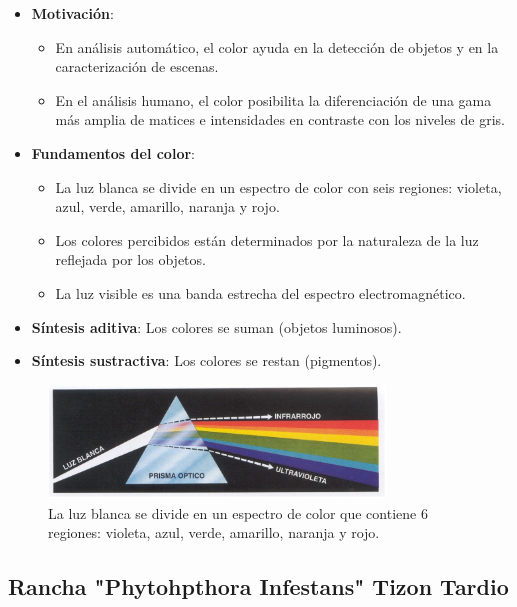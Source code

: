 \begin{itemize}
	\item \textbf{Motivación}:
	\begin{itemize}
		\item En análisis automático, el color ayuda en la detección de objetos y en la caracterización de escenas.
		\item En el análisis humano, el color posibilita la diferenciación de una gama más amplia de matices e intensidades en contraste con los niveles de gris.
	\end{itemize}
	\item \textbf{Fundamentos del color}: 
	\begin{itemize}
		\item La luz blanca se divide en un espectro de color con seis regiones: violeta, azul, verde, amarillo, naranja y rojo.
		\item Los colores percibidos están determinados por la naturaleza de la luz reflejada por los objetos.
		\item La luz visible es una banda estrecha del espectro electromagnético.
	\end{itemize}
	\item \textbf{Síntesis aditiva}: Los colores se suman (objetos luminosos).
	\item \textbf{Síntesis sustractiva}: Los colores se restan (pigmentos).
\end{itemize}
	\begin{figure}[H]
	\begin{center}
		\includegraphics[width=0.8\textwidth]{2/figures/vc6.jpeg}
		\caption{La luz blanca se divide en un espectro de color que contiene
			6 regiones: violeta, azul, verde, amarillo, naranja y rojo.}
		\label{}
	\end{center}
	
\end{figure}

 \subsection{Rancha "Phytohpthora Infestans" Tizon Tardio \citep*{prom2}}
 
